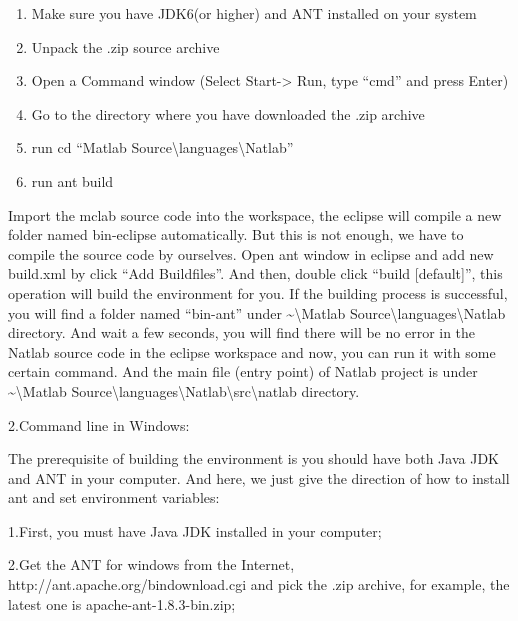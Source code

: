 \documentclass[letterpaper]{article}
\newcommand\liststyleLiii{%
\renewcommand\theenumi{\arabic{enumi}}
\renewcommand\theenumii{\arabic{enumii}}
\renewcommand\theenumiii{\arabic{enumiii}}
\renewcommand\theenumiv{\arabic{enumiv}}
\renewcommand\labelenumi{\theenumi.}
\renewcommand\labelenumii{\theenumii.}
\renewcommand\labelenumiii{\theenumiii.}
\renewcommand\labelenumiv{\theenumiv.}
}
\begin{document}
\bigskip

\liststyleLiii
\begin{enumerate}
\item Make sure you have JDK6(or higher) and ANT installed on your
system
\item Unpack the .zip source archive
\item Open a Command window (Select Start-{\textgreater} Run, type
{\textquotedblleft}cmd{\textquotedblright} and press Enter)
\item Go to the directory where you have downloaded the .zip archive
\item run cd {\textquotedblleft}Matlab
Source{\textbackslash}languages{\textbackslash}Natlab{\textquotedblright}
\item run ant build
\end{enumerate}

\bigskip

Import the mclab source code into the workspace, the eclipse will
compile a new folder named bin-eclipse automatically. But this is not
enough, we have to compile the source code by ourselves. Open ant
window in eclipse and add new build.xml by click {\textquotedblleft}Add
Buildfiles{\textquotedblright}. And then, double click
{\textquotedblleft}build [default]{\textquotedblright}, this operation
will build the environment for you. If the building process is
successful, you will find a folder named
{\textquotedblleft}bin-ant{\textquotedblright} under
\~{}{\textbackslash}Matlab
Source{\textbackslash}languages{\textbackslash}Natlab directory. And
wait a few seconds, you will find there will be no error in the Natlab
source code in the eclipse workspace and now, you can run it with some
certain command. And the main file (entry point) of Natlab project is
under \~{}{\textbackslash}Matlab
Source{\textbackslash}languages{\textbackslash}Natlab{\textbackslash}src{\textbackslash}natlab
directory.


\bigskip

2.Command line in Windows:

The prerequisite of building the environment is you should have both
Java JDK and ANT in your computer. And here, we just give the direction
of how to install ant and set environment variables:

1.First, you must have Java JDK installed in your computer;

2.Get the ANT for windows from the Internet,
http://ant.apache.org/bindownload.cgi and pick the .zip archive, for
example, the latest one is apache-ant-1.8.3-bin.zip;
\end{document}
